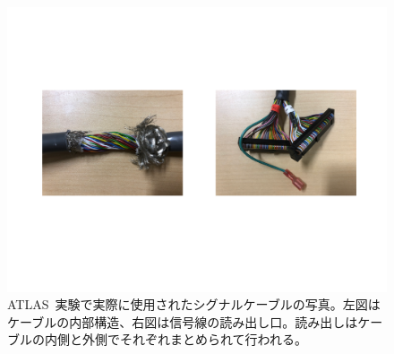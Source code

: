 \begin{figure}[H]
    \centering   
    \includegraphics[width=\textwidth,page=1]{img/photo/twistphoto.pdf}
    \caption[ATLAS~実験で実際に使用されたシグナルケーブルの写真]{ATLAS~実験で実際に使用されたシグナルケーブルの写真。左図はケーブルの内部構造、右図は信号線の読み出し口。読み出しはケーブルの内側と外側でそれぞれまとめられて行われる。}
    \label{fig:twist00}
\end{figure}

